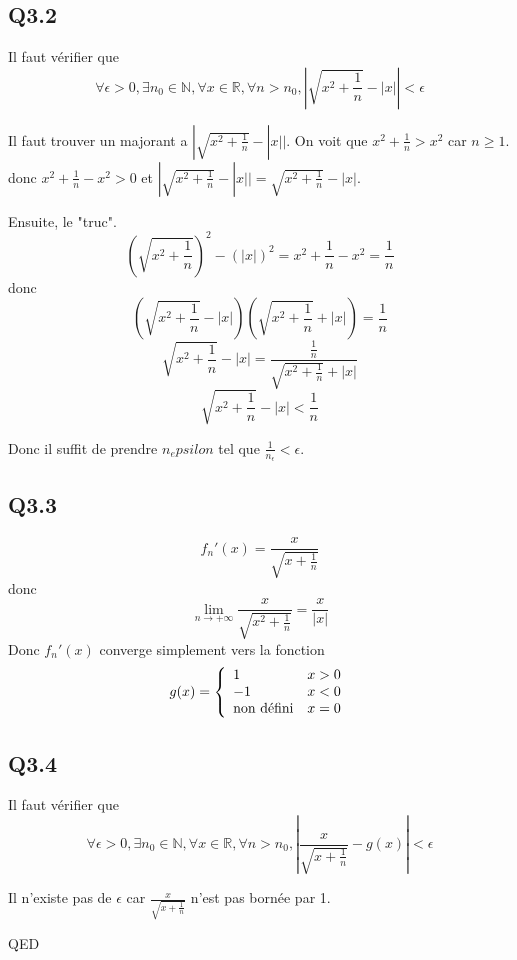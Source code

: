 \documentclass[]{book}
\theoremstyle{definition}
\newcommand{\bb}[1]{\mathbb{#1}}
\newcommand{\R}{\bb{R}}
\newcommand{\N}{\bb{N}}
\begin{document}
\subsection*{Q3.2}
Il faut v\'erifier que
$$\forall \epsilon > 0, \exists n_0 \in \N, \forall x \in \R, \forall n > n_0, \left|\sqrt{x^2+\frac{1}{n}} - |x|\right| < \epsilon$$

Il faut trouver un majorant a $|\sqrt{x^2+\frac{1}{n}} - |x||$. On voit que $x^2 + \frac{1}{n} > x^2$ car $n \geq 1$. donc $x^2 + \frac{1}{n} - x^2 > 0$ et $|\sqrt{x^2+\frac{1}{n}} - |x|| = \sqrt{x^2+\frac{1}{n}} - |x|$.

Ensuite, le "truc".
$$\left(\sqrt{x^2+\frac{1}{n}}\right)^2 - (|x|)^2 = x^2+\frac{1}{n} - x^2 = \frac{1}{n}$$
donc
$$\left(\sqrt{x^2+\frac{1}{n}} - |x|\right)\left(\sqrt{x^2+\frac{1}{n}} + |x|\right) = \frac{1}{n}$$
$$\sqrt{x^2+\frac{1}{n}} - |x| = \frac{\frac{1}{n}}{\sqrt{x^2+\frac{1}{n}} + |x|}$$
$$\sqrt{x^2+\frac{1}{n}} - |x| < \frac{1}{n}$$

Donc il suffit de prendre $n_epsilon$ tel que $\frac{1}{n_{\epsilon}} < \epsilon$.

\subsection*{Q3.3}
$$f_n'(x) = \frac{x}{\sqrt{x+\frac{1}{n}}}$$
donc
$$\lim_{n \to +\infty} \frac{x}{\sqrt{x^2+\frac{1}{n}}} = \frac{x}{|x|}$$
Donc $f_n'(x)$ converge simplement vers la fonction 
$$g(x) = 
\left\{
\begin{array}{l l}
1 & x > 0\\
-1 & x < 0\\
\text{non d\'efini} & x = 0\\
\end{array}
\right.
$$

\subsection*{Q3.4}
Il faut v\'erifier que
$$\forall \epsilon > 0, \exists n_0 \in \N, \forall x \in \R, \forall n > n_0, \left|\frac{x}{\sqrt{x+\frac{1}{n}}} - g(x)\right| < \epsilon$$

Il n'existe pas de $\epsilon$ car $\frac{x}{\sqrt{x+\frac{1}{n}}}$ n'est pas born\'ee par 1.


QED
\end{document}
